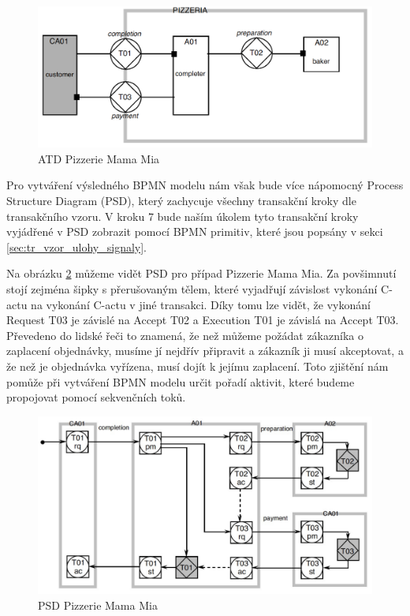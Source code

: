 \begin{figure}[H]\centering
\includegraphics[scale=0.35]{obrazky/ATD-pizzeria}
\caption{ATD Pizzerie Mama Mia \cite{Dietz2006}}
\label{fig:atd_pizzeria}
\end{figure}

Pro vytváření výsledného BPMN modelu nám však bude více nápomocný Process Structure Diagram (PSD), který zachycuje všechny transakční kroky dle transakčního vzoru. V kroku 7 bude naším úkolem tyto transakční kroky vyjádřené v PSD zobrazit pomocí BPMN primitiv, které jsou popsány v sekci \ref{sec:tr_vzor_ulohy_signaly}.

Na obrázku \ref{fig:psd_pizzeria} můžeme vidět PSD pro případ Pizzerie Mama Mia. Za povšimnutí stojí zejména šipky s přerušovaným tělem, které vyjadřují závislost vykonání C-actu na vykonání C-actu v jiné transakci. Díky tomu lze vidět, že vykonání Request T03 je závislé na Accept T02 a Execution T01 je závislá na Accept T03. Převedeno do lidské řeči to znamená, že než můžeme požádat zákazníka o zaplacení objednávky, musíme jí nejdřív připravit a zákazník ji musí akceptovat, a že než je objednávka vyřízena, musí dojít k jejímu zaplacení. Toto zjištění nám pomůže při vytváření BPMN modelu určit pořadí aktivit, které budeme propojovat pomocí sekvenčních toků.

\begin{figure}[H]\centering
\includegraphics[scale=0.35]{obrazky/PSD-pizzeria}
\caption{PSD Pizzerie Mama Mia \cite{Dietz2006}}
\label{fig:psd_pizzeria}
\end{figure}

